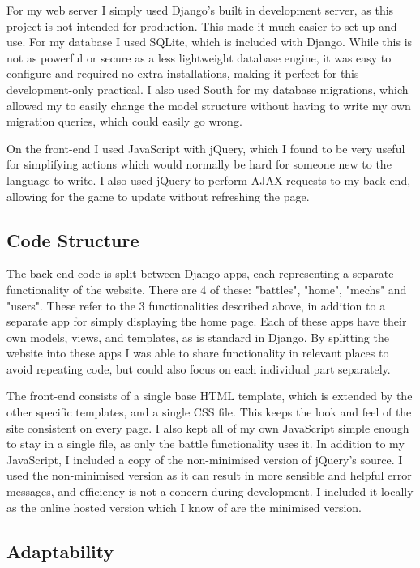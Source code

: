 \documentclass{article}
\begin{document}
For my web server I simply used Django's built in development server, as this project is not intended for production. This made it much easier to set up and use. For my database I used SQLite, which is included with Django. While this is not as powerful or secure as a less lightweight database engine, it was easy to configure and required no extra installations, making it perfect for this development-only practical. I also used South for my database migrations, which allowed my to easily change the model structure without having to write my own migration queries, which could easily go wrong.

On the front-end I used JavaScript with jQuery, which I found to be very useful for simplifying actions which would normally be hard for someone new to the language to write. I also used jQuery to perform AJAX requests to my back-end, allowing for the game to update without refreshing the page.

\subsection{Code Structure}

The back-end code is split between Django apps, each representing a separate functionality of the website. There are 4 of these: "battles", "home", "mechs" and "users". These refer to the 3 functionalities described above, in addition to a separate app for simply displaying the home page. Each of these apps have their own models, views, and templates, as is standard in Django. By splitting the website into these apps I was able to share functionality in relevant places to avoid repeating code, but could also focus on each individual part separately.

The front-end consists of a single base HTML template, which is extended by the other specific templates, and a single CSS file. This keeps the look and feel of the site consistent on every page. I also kept all of my own JavaScript simple enough to stay in a single file, as only the battle functionality uses it. In addition to my JavaScript, I included a copy of the non-minimised version of jQuery's source. I used the non-minimised version as it can result in more sensible and helpful error messages, and efficiency is not a concern during development. I included it locally as the online hosted version which I know of are the minimised version.

\subsection{Adaptability}
\end{document}
